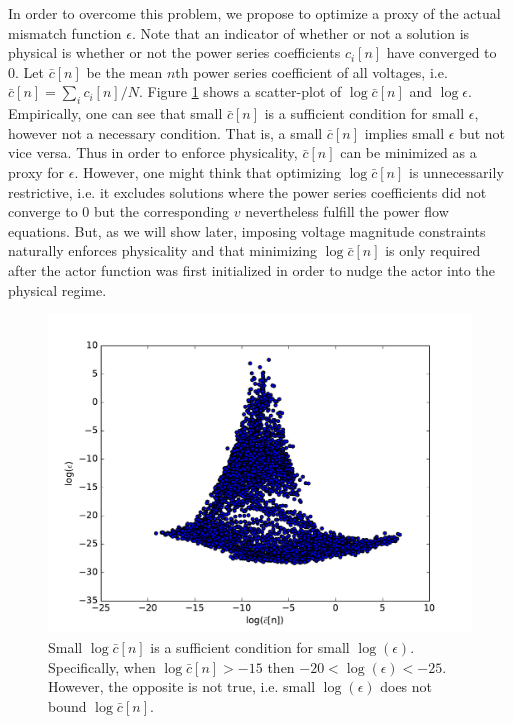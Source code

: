 In order to overcome this problem, we propose to optimize a proxy of the actual mismatch function $\epsilon$. Note that an indicator of whether or not a solution is physical is whether or not the power series coefficients $c_i[n]$ have converged to 0. Let $\bar{c}[n]$ be the mean $n$th power series coefficient of all voltages, i.e. $\bar{c}[n] = \sum_i c_i[n]/N$. Figure \ref{fig:ceps} shows a scatter-plot of $\log \bar{c}[n]$ and $\log \epsilon$. Empirically, one can see that small $\bar{c}[n]$ is a sufficient condition for small $\epsilon$, however not a necessary condition. That is, a small $\bar{c}[n]$ implies small $\epsilon$ but not vice versa. Thus in order to enforce physicality, $\bar{c}[n]$ can be minimized as a proxy for $ \epsilon$. However, one might think that optimizing $\log \bar{c}[n]$ is unnecessarily restrictive, i.e. it excludes solutions where the power series coefficients did not converge to 0 but the corresponding $v$ nevertheless fulfill the power flow equations. But, as we will show later, imposing voltage magnitude constraints naturally enforces physicality and that minimizing $\log \bar{c}[n]$ is only required after the actor function was first initialized in order to nudge the actor into the physical regime.


\begin{figure}
\includegraphics[width=\linewidth]{krtofl/ceps.pdf}
\caption[LOPF: Small power series coeffients imply small error.]{Small $\log \bar{c}[n]$ is a sufficient condition for small $\log(\epsilon)$. Specifically, when $\log \bar{c}[n] > -15$ then $-20 < \log(\epsilon) < -25$. However, the opposite is not true, i.e. small $\log(\epsilon)$ does not bound $\log \bar{c}[n]$.}
\label{fig:ceps}
\end{figure}

